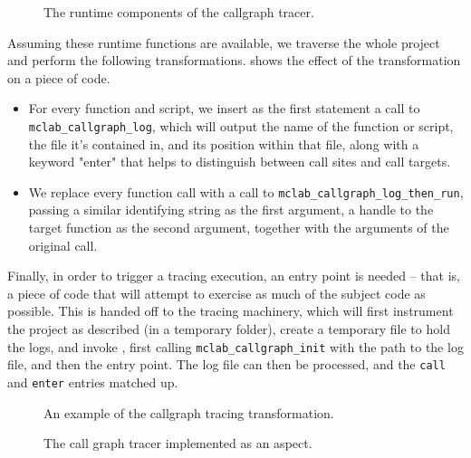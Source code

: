 \begin{figure}

\caption{The runtime components of the callgraph tracer.}
\label{Fig:CallgraphRuntime}
\end{figure}

Assuming these runtime functions are available, we traverse the whole project
and perform the following transformations.  shows
the effect of the transformation on a piece of \matlab code.

\begin{itemize}

\item For every function and script, we insert as the first statement a call to
  \texttt{mclab\_callgraph\_log}, which will output the name of the function or
  script, the file it's contained in, and its position within that file, along
  with a keyword "enter" that helps to distinguish between call sites and call
  targets.

\item We replace every function call with a call to
  \texttt{mclab\_callgraph\_log\_then\_run}, passing a similar identifying
  string as the first argument, a handle to the target function as the second
  argument, together with the arguments of the original call.

\end{itemize}

Finally, in order to trigger a tracing execution, an entry point is needed --
that is, a piece of code that will attempt to exercise as much of the subject
code as possible. This is handed off to the tracing machinery, which will first
instrument the project as described (in a temporary folder), create a temporary
file to hold the logs, and invoke \matlab, first calling
\texttt{mclab\_callgraph\_init} with the path to the log file, and then the
entry point. The log file can then be processed, and the \texttt{call} and
\texttt{enter} entries matched up.

\begin{figure}
\begin{minipage}{0.3\linewidth}

\end{minipage}
\hfill \hspace{.3cm} \hfill
\begin{minipage}{0.7\linewidth}

\end{minipage}
\caption{An example of the callgraph tracing transformation.}
\label{Fig:CallgraphBeforeAfter}
\end{figure}


\begin{figure}

\caption{The call graph tracer implemented as an aspect.}
\label{Fig:CallgraphAspect}
\end{figure}
